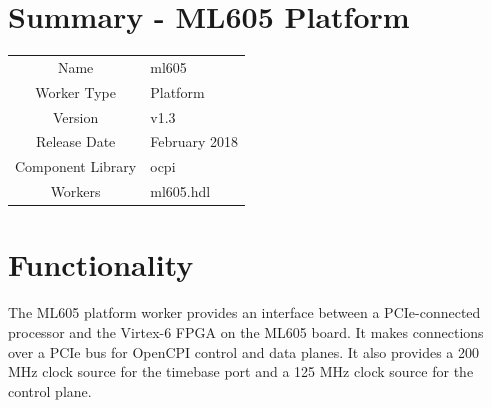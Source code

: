 \documentclass{article}
\author{} %
\date{Version \docVersion} %
\title{\docTitle}
\def\docVersion{1.3}
\def\comp{ml605}
\def\Comp{ML605 Platform}
\begin{document}
\section*{Summary - \Comp}
\begin{tabular}{|c|M{13.5cm}|}
	\hline
	                  &                                                    \\
	\hline
	Name              & \comp                                              \\
	\hline
	Worker Type       & Platform                                           \\
	\hline
	Version           & v\docVersion \\
	\hline
	Release Date      & February 2018 \\
	\hline
	Component Library & ocpi                                        \\
	\hline
	Workers & \comp.hdl                                        \\
	\hline
\end{tabular}

\section*{Functionality}
\begin{flushleft}
	The ML605 platform worker provides an interface between a PCIe-connected processor and the Virtex-6 FPGA on the ML605 board. It makes connections over a PCIe bus for OpenCPI control and data planes. It also provides a 200 MHz clock source for the timebase port and a 125 MHz clock source for the control plane.
\end{flushleft}
\end{document}
